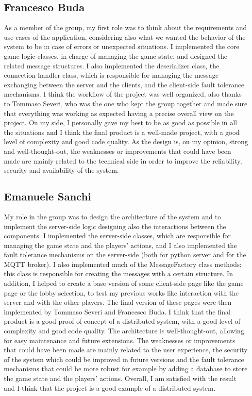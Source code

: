 \documentclass{scrartcl}
\begin{document}
\subsection{Francesco Buda}\label{francesco-buda}
As a member of the group, my first role was to think about the requirements and use cases of the application,
considering also what we wanted the behavior of the system to be in case of errors or unexpected situations.
I implemented the core game logic classes, in charge of managing the game state, and designed the related 
message structures. I also implemented the deserializer class, the connection handler class, which is
responsible for managing the message exchanging between the server and the clients, and the client-side fault
tolerance mechanisms. I think the workflow of the project was well organized, also thanks to Tommaso Severi, who
was the one who kept the group together and made sure that everything was working as expected having a precise
overall view on the project. On my side, I personally gave my best to be as good as possible in all the situations
and I think the final product is a well-made project, with a good level of complexity and good code quality. 
As the design is, on my opinion, strong and well-thought-out, the weaknesses or improvements that could have been made are
mainly related to the technical side in order to improve the reliability, security and availability of the system.

\subsection{Emanuele Sanchi}\label{emanuele-sanchi}
My role in the group was to design the architecture of the system and to implement the server-side logic designing also the interactions between the components. I implemented the server-side classes, which are responsible for managing the game state and the players' actions, and I also implemented the fault tolerance mechanisms on the server-side (both for python server and for the MQTT broker). I also implemented much of the MessageFactory class methods; this class is responsible for creating the messages with a certain structure. In addition, I helped to create a base version of some client-side page like the game page or the lobby selection, to test my previous works like interaction with the server and with the other players. The final version of these pages were then implemented by Tommaso Severi and Francesco Buda. I think that the final product is a good proof of concept of a distributed system, with a good level of complexity and good code quality. The architecture is well-thought-out, allowing for easy maintenance and future extensions. The weaknesses or improvements that could have been made are mainly related to the user experience, the security of the system which could be improved in future versions and the fault tolerance mechanisms that could be more robust for example by adding a database to store the game state and the players' actions. Overall, I am satisfied with the result and I think that the project is a good example of a distributed system.
\end{document}
